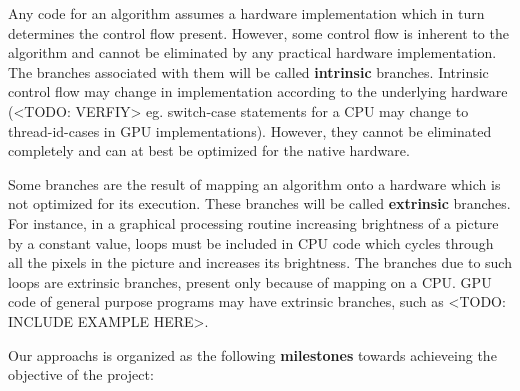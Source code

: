 
\par{
Any code for an algorithm assumes a hardware implementation which in turn determines the control flow present. However, some control flow is inherent to the algorithm and cannot be eliminated by any practical hardware implementation. The branches associated with them will be called \textbf{intrinsic} branches. Intrinsic control flow may change in implementation according to the underlying hardware (<TODO: VERFIY> eg. switch-case statements for a CPU may change to thread-id-cases in GPU implementations). However, they cannot be eliminated completely and can at best be optimized for the native hardware.
}

\par{
Some branches are the result of mapping an algorithm onto a hardware which is not optimized for its execution. These branches will be called \textbf{extrinsic} branches. For instance, in a graphical processing routine increasing brightness of a picture by a constant value, loops must be included in CPU code which cycles through all the pixels in the picture and increases its brightness. The branches due to such loops are extrinsic branches, present only because of mapping on a CPU. GPU code of general purpose programs may have extrinsic branches, such as <TODO: INCLUDE EXAMPLE HERE>.  
} 

\par{Our approachs is organized as the following \textbf{milestones} towards achieveing the objective of the project:}

